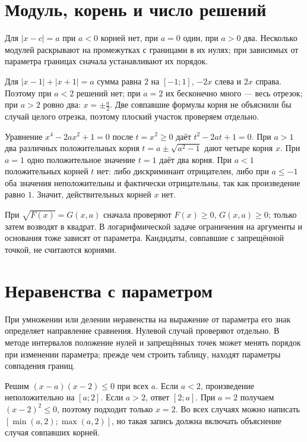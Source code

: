 \section{Модуль, корень и число решений}
Для \(|x-c|=a\) при \(a<0\) корней нет, при \(a=0\) один, при \(a>0\) два. Несколько модулей раскрывают на промежутках с границами в их нулях; при зависимых от параметра границах сначала устанавливают их порядок.
\begin{example}Для \(|x-1|+|x+1|=a\) сумма равна \(2\) на \([-1;1]\), \(-2x\) слева и \(2x\) справа. Поэтому при \(a<2\) решений нет; при \(a=2\) их бесконечно много — весь отрезок; при \(a>2\) ровно два: \(x=\pm \frac a2\). Две совпавшие формулы корня не объяснили бы случай целого отрезка, поэтому плоский участок проверяем отдельно.\end{example}
\begin{example}Уравнение \(x^4-2ax^2+1=0\) после \(t=x^2\geq0\) даёт \(t^2-2at+1=0\). При \(a>1\) два различных положительных корня \(t=a\pm\sqrt{a^2-1}\) дают четыре корня \(x\). При \(a=1\) одно положительное значение \(t=1\) даёт два корня. При \(a<1\) положительных корней \(t\) нет: либо дискриминант отрицателен, либо при \(a\leq-1\) оба значения неположительны и фактически отрицательны, так как произведение равно \(1\). Значит, действительных корней \(x\) нет.\end{example}
При \(\sqrt{F(x)}=G(x,a)\) сначала проверяют \(F(x)\geq0\), \(G(x,a)\geq0\); только затем возводят в квадрат. В логарифмической задаче ограничения на аргументы и основания тоже зависят от параметра. Кандидаты, совпавшие с запрещённой точкой, не считаются корнями.

\section{Неравенства с параметром}
При умножении или делении неравенства на выражение от параметра его знак определяет направление сравнения. Нулевой случай проверяют отдельно. В методе интервалов положение нулей и запрещённых точек может менять порядок при изменении параметра; прежде чем строить таблицу, находят параметры совпадения границ.
\begin{example}Решим \((x-a)(x-2)\leq0\) при всех \(a\). Если \(a<2\), произведение неположительно на \([a;2]\). Если \(a>2\), ответ \([2;a]\). При \(a=2\) получаем \((x-2)^2\leq0\), поэтому подходит только \(x=2\). Во всех случаях можно написать \([\min(a,2);\max(a,2)]\), но такая запись должна включать объяснение случая совпавших корней.\end{example}

